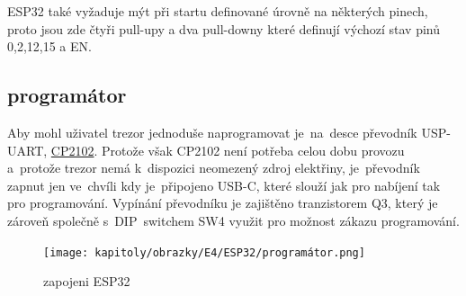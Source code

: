 ESP32 také vyžaduje mýt při startu definované úrovně na některých pinech, proto jsou zde čtyři pull-upy a dva pull-downy které definují výchozí stav
pinů 0,2,12,15 a EN. 
\begin{table}[h]
    \centering
    \caption{popis funkce pinu}
    \label{tab:COMPARATION}
\end{table}

\newpage

\subsection{programátor}
Aby mohl uživatel trezor jednoduše naprogramovat je~na~desce převodník USP-UART, \href{https://www.silabs.com/documents/public/data-sheets/cp2102n-datasheet.pdf}{CP2102}.
Protože však CP2102 není potřeba celou dobu provozu a~protože trezor nemá k~dispozici neomezený zdroj elektřiny, je~převodník zapnut jen ve~chvíli 
kdy je~připojeno USB-C, které slouží jak pro nabíjení tak pro programování. Vypínání převodníku je zajištěno tranzistorem Q3, který je zároveň společně
s~DIP~switchem SW4 využit pro možnost zákazu programování.

\begin{figure}[htbp]
    \centering
    \texttt{[image: kapitoly/obrazky/E4/ESP32/programátor.png]}
    \caption{zapojeni ESP32}
    \label{fig:E4-step-up}
\end{figure}

\newpage